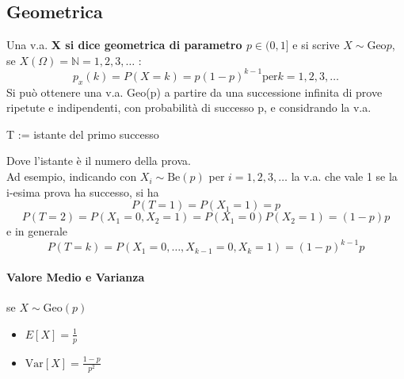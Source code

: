 \documentclass[12pt, a4paper, openany]{book}
\begin{document}
\subsection*{Geometrica}
Una v.a. \textbf{X si dice geometrica di parametro $p \in (0,1]$} e si scrive 
\textbf{$X \sim \text{Geo}p$}, se \textbf{$X(\Omega)=\mathbb{N} = {1,2,3,\dots}$} :
\begin{equation*}
    p_x (k) = P(X = k) = p(1-p)^{k-1} \text{per} k=1,2,3,\dots
\end{equation*}
Si può ottenere una v.a. Geo(p) a partire da una successione infinita di prove ripetute
e indipendenti, con probabilità di successo p, e considrando la v.a.
\begin{center}
    T := istante del primo successo
\end{center}
Dove l'istante è il numero della prova.
\\ Ad esempio, indicando con $X_i \sim \text{Be}(p)$ per $i=1,2,3,\dots$ la v.a. che vale 1
se la i-esima prova ha successo, si ha
\begin{equation*}
    P(T=1) = P(X_1 = 1) = p
\end{equation*}
\begin{equation*}
    P(T=2) = P(X_1 = 0, X_2 = 1) = P(X_1 = 0)P(X_2 = 1) = (1-p)p
\end{equation*}
e in generale
\begin{equation*}
    P(T=k) = P(X_1=0, \dots, X_{k-1} = 0, X_k = 1) = (1-p)^{k-1}p
\end{equation*}
\paragraph*{Valore Medio e Varianza} se $X\sim \text{Geo}(p)$
\begin{itemize}
    \item $E[X] = \frac{1}{p}$
    \item $\text{Var}[X] = \frac{1-p}{p^2}$
\end{itemize}

\end{document}
